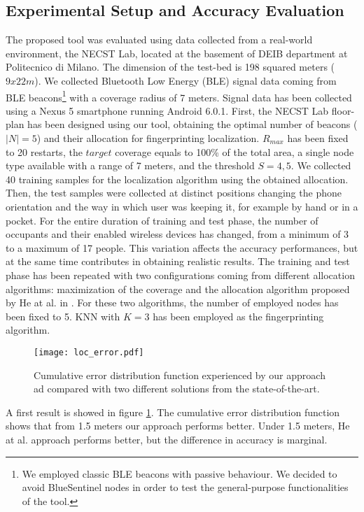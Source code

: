 \subsection{Experimental Setup and Accuracy Evaluation}
The proposed tool was evaluated using data collected from a real-world environment, the NECST Lab, located at the basement of DEIB department at Politecnico di Milano. The dimension of the test-bed is 198 squared meters ($9x22m$). We collected Bluetooth Low Energy (BLE) signal data coming from BLE beacons\footnote{We employed classic BLE beacons with passive behaviour. We decided to avoid BlueSentinel nodes in order to test the general-purpose functionalities of the tool.}
with a coverage radius of 7 meters. Signal data has been collected using a Nexus 5 smartphone running Android 6.0.1.
First, the NECST Lab floor-plan has been designed using our tool, obtaining the optimal number of beacons ($|N|=5$) and their allocation for fingerprinting localization. $R_{max}$ has been fixed to 20 restarts, the $target$ coverage equals to 100\% of the total area, a single node type available with a range of 7 meters, and the threshold $S=4,5$.
We collected 40 training samples for the localization algorithm using the obtained allocation. Then, the test samples were collected at distinct positions changing the phone orientation and the way in which user was keeping it, for example by hand or in a pocket. For the entire duration of training and test phase, the number of occupants and their enabled wireless devices has changed, from a minimum of 3 to a maximum of 17 people. This variation affects the accuracy performances, but at the same time contributes in obtaining realistic results. The training and test phase has been repeated with two configurations coming from different allocation algorithms: maximization of the coverage \cite{Kouakou2010a} and the allocation algorithm proposed by He at al. in \cite{He2011}. For these two algorithms, the number of employed nodes has been fixed to 5.
KNN with $K=3$ has been employed as the fingerprinting algorithm.

\begin{figure}[h!tb]
\centering\texttt{[image: loc\_error.pdf]}
\caption{Cumulative error distribution function experienced by our approach ad compared with two different solutions from the state-of-the-art.}
\label{fig:loc_error}
\end{figure}

A first result is showed in figure \ref{fig:loc_error}. The cumulative error distribution function shows that from 1.5 meters our approach performs better. Under 1.5 meters, He at al. approach performs better, but the difference in accuracy is marginal.

